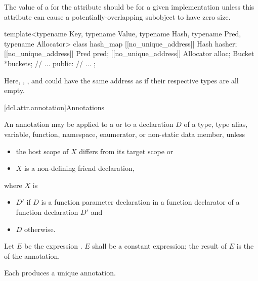 \recommended
The value of a 
for the  attribute
should be  for a given implementation
unless this attribute can cause a potentially-overlapping subobject
to have zero size.

\begin{example}
\begin{codeblock}
template<typename Key, typename Value,
         typename Hash, typename Pred, typename Allocator>
class hash_map {
  [[no_unique_address]] Hash hasher;
  [[no_unique_address]] Pred pred;
  [[no_unique_address]] Allocator alloc;
  Bucket *buckets;
  // ...
public:
  // ...
};
\end{codeblock}
Here, , , and 
could have the same address as 
if their respective types are all empty.
\end{example}

[dcl.attr.annotation]{Annotations}%

\pnum
An annotation may be applied
to a  or
to a declaration $D$ of a
type,
type alias,
variable,
function,
namespace,
enumerator, or
non-static data member,
unless
\begin{itemize}
\item the host scope of $X$ differs from its target scope or
\item $X$ is a non-defining friend declaration,
\end{itemize}
where $X$ is
\begin{itemize}
\item
$D'$ if $D$ is a function parameter declaration in
a function declarator of a function declaration $D'$ and
\item $D$ otherwise.
\end{itemize}

\pnum
Let $E$ be the expression
.
$E$ shall be a constant expression;
the result of $E$ is the  of the annotation.

\pnum
Each  produces a unique annotation.

